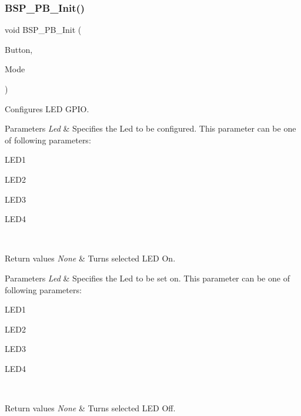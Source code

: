 \subsubsection{B\+S\+P\+\_\+\+P\+B\+\_\+\+Init()}
{\footnotesize\ttfamily void B\+S\+P\+\_\+\+P\+B\+\_\+\+Init (\begin{DoxyParamCaption}\item[{\textbf{ Button\+\_\+\+Type\+Def}}]{Button,  }\item[{\textbf{ Button\+Mode\+\_\+\+Type\+Def}}]{Mode }\end{DoxyParamCaption})}



Configures L\+ED G\+P\+IO. 


\begin{DoxyParams}{Parameters}
{\em Led} & Specifies the Led to be configured. This parameter can be one of following parameters\+: \begin{DoxyItemize}
\item L\+E\+D1 \item L\+E\+D2 \item L\+E\+D3 \item L\+E\+D4 \end{DoxyItemize}
\\
\hline
\end{DoxyParams}

\begin{DoxyRetVals}{Return values}
{\em None} & Turns selected L\+ED On. \\
\hline
\end{DoxyRetVals}

\begin{DoxyParams}{Parameters}
{\em Led} & Specifies the Led to be set on. This parameter can be one of following parameters\+: \begin{DoxyItemize}
\item L\+E\+D1 \item L\+E\+D2 \item L\+E\+D3 \item L\+E\+D4 ~\newline
~\newline
~\newline
~\newline
\end{DoxyItemize}
\\
\hline
\end{DoxyParams}

\begin{DoxyRetVals}{Return values}
{\em None} & Turns selected L\+ED Off. \\
\hline
\end{DoxyRetVals}

